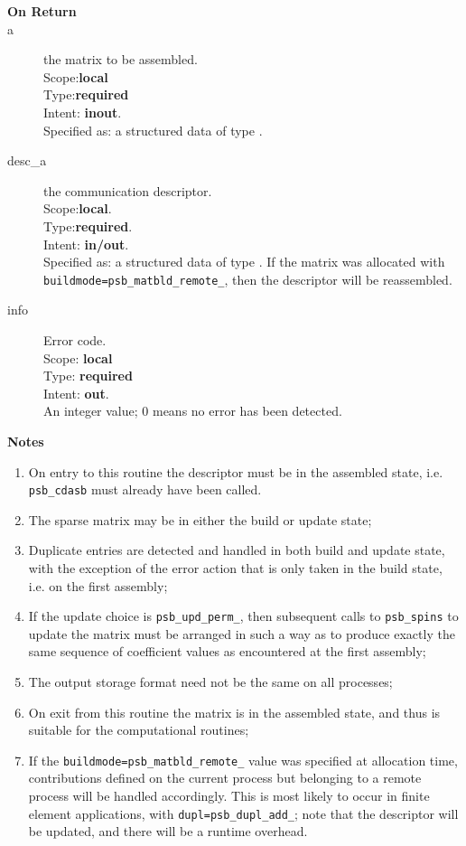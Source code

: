 \begin{description}
\item[\bf On Return]
\item[a] the matrix to be assembled.\\
Scope:{\bf local}\\
Type:{\bf required}\\
Intent: {\bf inout}.\\
Specified as: a structured data of type \spdata.
\item[desc\_a] the communication descriptor.\\
Scope:{\bf local}.\\
Type:{\bf required}.\\
Intent: {\bf in/out}.\\
Specified as: a structured data of type \descdata. If the matrix was
allocated with \verb|buildmode=psb_matbld_remote_|, then the
descriptor will be reassembled. 
\item[info] Error code.\\
Scope: {\bf local} \\
Type: {\bf required} \\
Intent: {\bf out}.\\
An integer value; 0 means no error has been detected. 
\end{description}

{\par\noindent\large\bfseries Notes}
\begin{enumerate}
\item On entry to this routine the descriptor must  be in  the
  assembled state, i.e. \verb|psb_cdasb| must already have been called.
\item The sparse matrix may be in either the build or update state;
\item Duplicate entries are detected and handled in both build and
  update state, with the exception of the error action that is only
  taken in the build state, i.e. on the first assembly; 
\item If the update choice is \verb|psb_upd_perm_|, then subsequent
  calls to \verb|psb_spins| to update the matrix must be arranged in
  such a way as to produce exactly the same sequence of coefficient
  values as encountered at the first assembly; 
\item The output storage format need not be the same on all
  processes; 
\item On exit from this routine the matrix is in the assembled state,
  and thus is suitable for the computational routines;
\item If the \verb|buildmode=psb_matbld_remote_| value was specified
  at allocation time, contributions defined on the current process but
  belonging to a remote process will be handled accordingly. This is
  most likely to occur in finite element applications, with
  \verb|dupl=psb_dupl_add_|; note that the descriptor will be updated,
  and there will be a runtime overhead. 
\end{enumerate}



